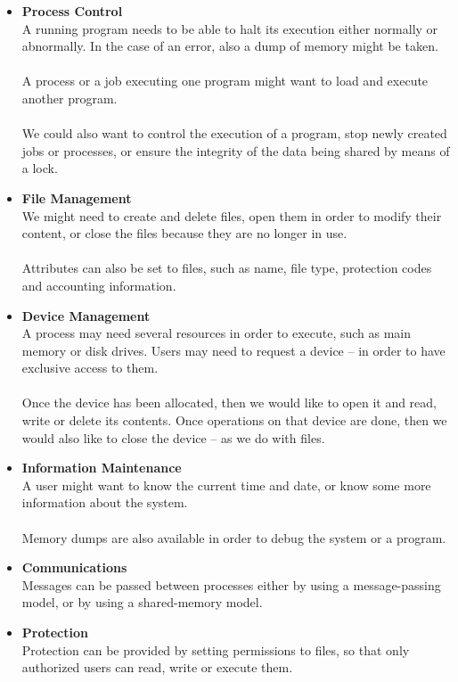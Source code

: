 \documentclass{article}
\begin{document}
\begin{itemize}
	\item \textbf{Process Control}
	\vspace{.2cm} \\
	A running program needs to be able to halt its execution either normally or abnormally. In the case of an error, also a dump of memory might be taken. \\ \\
	A process or a job executing one program might want to load and execute another program. \\ \\
	We could also want to control the execution of a program, stop newly created jobs or processes, or ensure the integrity of the data being shared by means of a lock.
	
	\item \textbf{File Management}
	\vspace{.2cm} \\
	We might need to create and delete files, open them in order to modify their content, or close the files because they are no longer in use. \\ \\
	Attributes can also be set to files, such as name, file type,  protection codes and accounting information.		
	
	\item \textbf{Device Management}
	\vspace{.2cm} \\
	A process may need several resources in order to execute, such as main memory or disk drives. Users may need to request a device -- in order to have exclusive access to them. \\ \\
	Once the device has been allocated, then we would like to open it and read, write or delete its contents. Once operations on that device are done, then we would also like to close the device -- as we do with files.
	
	\item \textbf{Information Maintenance}
	\vspace{.2cm} \\
	A user might want to know the current time and date, or know some more information about the system. \\ \\
	Memory dumps are also available in order to debug the system or a program.
	
	\item \textbf{Communications}
	\vspace{.2cm} \\
	Messages can be passed between processes either by using a message-passing model, or by using a shared-memory model.	
	
	\item \textbf{Protection}
	\vspace{.2cm} \\
	Protection can be provided by setting permissions to files, so that only authorized users can read, write or execute them.
\end{itemize}
\end{document}
